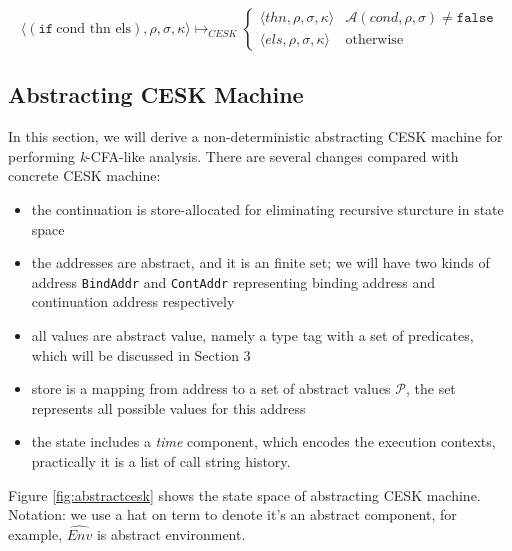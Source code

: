 \documentclass[paper=a4, fontsize=11pt]{scrartcl} %
\numberwithin{equation}{section} %
\numberwithin{figure}{section} %
\numberwithin{table}{section} %
\begin{document}
$$ \langle (\texttt{if}~\text{cond thn els}), \rho, \sigma, \kappa \rangle \longmapsto_{CESK} 
\begin{cases}
\langle thn, \rho, \sigma, \kappa \rangle & \mathcal{A}(cond, \rho, \sigma) \neq \texttt{false}
\\
\langle els, \rho, \sigma, \kappa \rangle & \text{otherwise}
\end{cases}$$


\subsection{Abstracting CESK Machine}

In this section, we will derive a non-deterministic abstracting CESK machine for performing \textit{k}-CFA-like analysis\cite{VanHorn:2010:AAM:1863543.1863553}. There are several changes compared with concrete CESK machine: 

\begin{itemize}
\item the continuation is store-allocated for eliminating recursive sturcture in state space
\item the addresses are abstract, and it is an finite set; we will have two kinds of address \texttt{BindAddr} and \texttt{ContAddr} representing binding address and continuation address respectively
\item all values are abstract value, namely a type tag with a set of predicates, which will be discussed in Section 3
\item store is a mapping from address to a set of abstract values $\mathcal{P}$, the set represents all possible values for this address
\item the state includes a \textit{time} component, which encodes the execution contexts, practically it is a list of call string history.
\end{itemize}

Figure \ref{fig:abstractcesk} shows the state space of abstracting CESK machine. Notation: we use a hat on term to denote it's an abstract component, for example, $\widehat{Env}$ is abstract environment.
\end{document}
